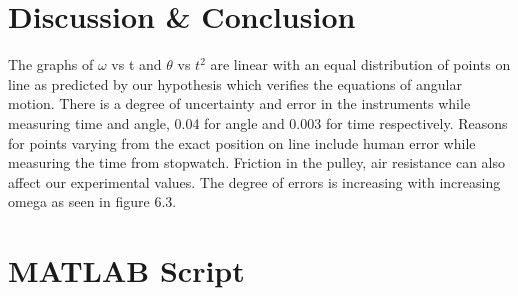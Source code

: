 \section{Discussion \& Conclusion}

The graphs of $\omega$ vs t and $\theta$ vs $t^2$ are linear with an equal distribution of points on line as predicted by our hypothesis which verifies the equations of angular motion. There is a degree of uncertainty and error in the instruments while measuring time and angle, 0.04 for angle and 0.003 for time respectively. Reasons for points varying from the exact position on line include human error while measuring the time from stopwatch. Friction in the pulley, air resistance can also affect our experimental values. The degree of errors is increasing with increasing omega as seen in figure 6.3. 



\section{MATLAB Script}




